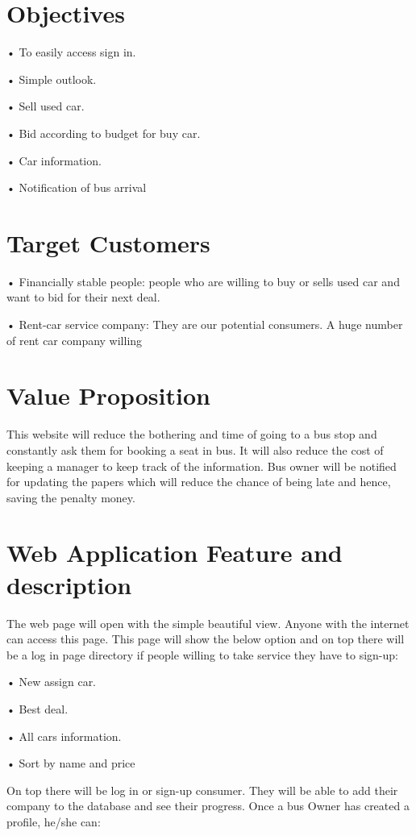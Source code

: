 \documentclass{report}
\begin{document}
\section{Objectives}

•	To easily access sign in.

•	Simple outlook.

•	Sell used car.

•	Bid according to budget for buy car.

•	Car information.

•	Notification of bus arrival


\section{Target Customers}

•	Financially stable people: people who are willing to buy or sells used car and want to bid for their next deal.

•	Rent-car service company: They are our potential consumers. A huge number of rent car company willing 
\section{Value Proposition}
This website will reduce the bothering and time of going to a bus stop and constantly ask them for booking a seat in bus. It will also reduce the cost of keeping a manager to keep track of the information. Bus owner will be notified for updating the papers which will reduce the chance of being late and hence, saving the penalty money.

\section{Web Application Feature and description}
The web page will open with the simple beautiful view. Anyone with the internet can access this page. This page will show the below option and on top there will be a log in page directory if people willing to take service they have to sign-up: 
  
•	New assign car.

•	Best deal.

•	All cars information.

•	Sort by name and price

On top there will be log in or sign-up consumer. They will be able to add their company to the database and see their progress. Once a bus Owner has created a profile, he/she can:
\end{document}
